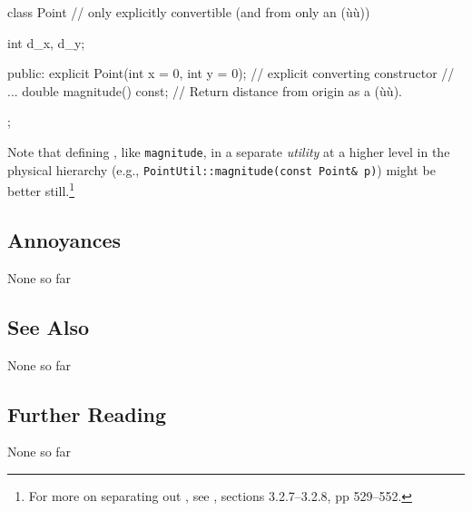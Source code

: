 \begin{emcppslisting}
class Point  // only explicitly convertible (and from only an (ù{}ù))
{
    int d_x, d_y;

public:
    explicit Point(int x = 0, int y = 0);  // explicit converting constructor
    // ...
    double magnitude() const;  // Return distance from origin as a (ù{}ù).
};
\end{emcppslisting}
    
\noindent Note that defining , like
\lstinline!magnitude!, in a separate \emph{utility} at a higher level in the
physical hierarchy (e.g., \lstinline!PointUtil::magnitude(const!~\lstinline!Point&!~\lstinline!p)!) might be better still.{\cprotect\footnote{For more on
separating out , see
  \cite{lakos20}, sections 3.2.7--3.2.8, pp 529--552.}}

\subsection[Annoyances]{Annoyances}\label{annoyances}

None so far

\subsection[See Also]{See Also}\label{see-also}

None so far

\subsection[Further Reading]{Further Reading}\label{further-reading}

None so far

